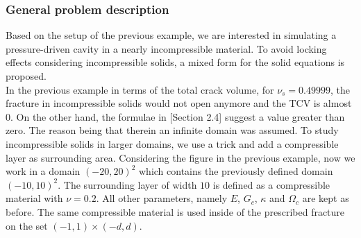 \subsubsection{General problem description}

Based on the setup of the previous example, we are interested in simulating a pressure-driven cavity in a nearly incompressible material. To avoid locking effects considering incompressible solids, 
a mixed form for the solid equations is proposed.\\

In the previous example in terms of the total crack volume, 
for $\nu_s = 0.49999$, the fracture in incompressible 
solids would not open anymore and the TCV is almost $0$. On the other hand, 
the formulae in \cite{SneddLow69}[Section 2.4] suggest a value greater than zero. 
The reason being that therein an infinite domain was assumed.
To study incompressible solids in larger domains, we use a trick and add a compressible 
layer as surrounding area. Considering the figure in the previous example, now we work in a domain $(-20,20)^2$ which contains the previously defined domain $(-10,10)^2$.
The surrounding layer of width $10$ is defined as a compressible material with $\nu = 0.2$.
All other parameters, namely $E$, $G_c$, $\kappa$ and $\Omega_c$ are
kept as before.
The same compressible material is used inside of the prescribed
fracture on the set $(-1,1)\times (-d,d)$.

